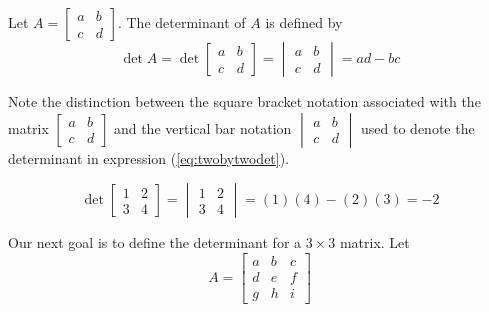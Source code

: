 \documentclass{ximera}
\begin{document}
\begin{definition}\label{def:twobytwodet}
Let $A=\begin{bmatrix}a&b\\c&d\end{bmatrix}$.  The determinant of $A$ is defined by 
\begin{equation}\label{eq:twobytwodet}\det{A}=\det{\begin{bmatrix}a&b\\c&d\end{bmatrix}}=\begin{vmatrix}a&b\\c&d\end{vmatrix}=ad-bc\end{equation}
\end{definition}
Note the distinction between the square bracket notation associated with the matrix $\begin{bmatrix}a&b\\c&d\end{bmatrix}$ and the vertical bar notation $\begin{vmatrix}a&b\\c&d\end{vmatrix}$ used to denote  the determinant in expression (\ref{eq:twobytwodet}).

\begin{example}
$$\det{\begin{bmatrix}1&2\\3&4\end{bmatrix}}=\begin{vmatrix}1&2\\3&4\end{vmatrix}=(1)(4)-(2)(3)=-2$$
\end{example}

Our next goal is to define  the determinant for a $3\times 3$ matrix.  Let 
$$A=\begin{bmatrix}a&b&c\\d&e&f\\g&h&i\end{bmatrix}$$
\end{document}
